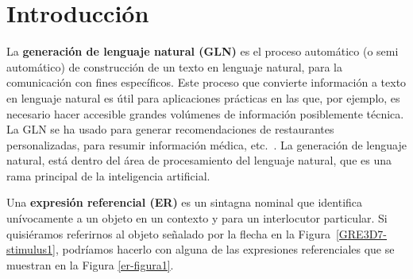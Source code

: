 \chapter{Introducci\'on}
\label{sec:intro}

La {\bf generaci\'on de lenguaje natural (GLN)} es el proceso autom\'atico (o semi autom\'atico) de construcci\'on de un texto en lenguaje natural, para la comunicaci\'on con fines espec\'ificos. Este proceso que convierte informaci\'on a texto en lenguaje natural es \'util para aplicaciones pr\'acticas en las que, por ejemplo, es necesario hacer accesible grandes vol\'umenes de informaci\'on posiblemente t\'ecnica. La GLN se ha usado para generar recomendaciones de restaurantes personalizadas, para resumir informaci\'on m\'edica, etc.~\cite{dale2000}. La generaci\'on de lenguaje natural, est\'a dentro del \'area de procesamiento del lenguaje natural, que es una rama principal de la inteligencia artificial.

Una {\bf expresi\'on referencial (ER)} es un sintagna nominal que identifica un\'ivocamente a un objeto en un contexto y para un interlocutor particular. Si quisi\'eramos referirnos al objeto se\~nalado por la flecha en la Figura~\ref{GRE3D7-stimulus1}, podr\'iamos hacerlo con alguna de las expresiones referenciales que se muestran en la Figura \ref{er-figura1}.

